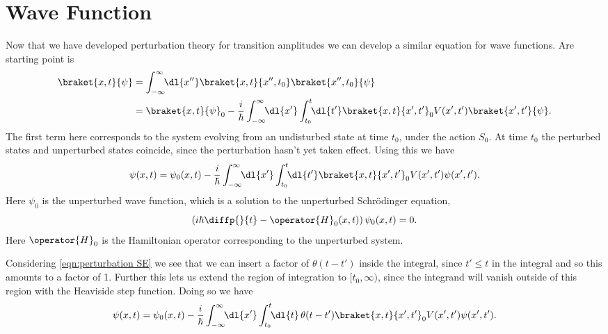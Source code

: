 \documentclass[fleqn]{NotesClass}
\newcommand*{\hamiltonian}{H}
\begin{document}
    \section{Wave Function}
    Now that we have developed perturbation theory for transition amplitudes we can develop a similar equation for wave functions.
    Are starting point is
    \begin{align}
        \braket{x, t}{\psi} &= \int_{-\infty}^{\infty} \!\! \dl{x''} \braket{x, t}{x'', t_0} \braket{x'', t_0}{\psi}\\
        &= \braket{x, t}{\psi}_{0} - \frac{i}{\hbar} \int_{-\infty}^{\infty} \!\! \dl{x'} \int_{t_0}^{t} \!\! \dl{t'} \braket{x, t}{x', t'}_0 V(x', t') \braket{x', t'}{\psi}.
    \end{align}
    The first term here corresponds to the system evolving from an undisturbed state at time \(t_0\), under the action \(S_0\).
    At time \(t_0\) the perturbed states and unperturbed states coincide, since the perturbation hasn't yet taken effect.
    Using this we have
    \begin{equation}\label{eqn:perturbation SE}
        \psi(x, t) = \psi_0(x, t) - \frac{i}{\hbar} \int_{-\infty}^{\infty} \!\! \dl{x'} \int_{t_0}^{t} \!\! \dl{t'} \braket{x, t}{x', t'}_0 V(x', t') \psi(x', t').
    \end{equation}
    Here \(\psi_0\) is the unperturbed wave function, which is a solution to the unperturbed Schr\"odinger equation,
    \begin{equation}
        \left( i\hbar\diffp{}{t} - \operator{\hamiltonian}_0(x, t) \right) \psi_0(x, t) = 0.
    \end{equation}
    Here \(\operator{\hamiltonian}_0\) is the Hamiltonian operator corresponding to the unperturbed system.
    
    Considering \cref{eqn:perturbation SE} we see that we can insert a factor of \(\theta(t - t')\) inside the integral, since \(t' \le t\) in the integral and so this amounts to a factor of 1.
    Further this lets us extend the region of integration to \([t_0, \infty)\), since the integrand will vanish outside of this region with the Heaviside step function.
    Doing so we have
    \begin{equation}
        \psi(x, t) = \psi_0(x, t) - \frac{i}{\hbar} \int_{-\infty}^{\infty} \!\! \dl{x'} \int_{t_0}^{t} \!\! \dl{t} \, \theta(t - t') \braket{x, t}{x', t'}_0 V(x', t') \psi(x', t').
    \end{equation}
    
\end{document}
